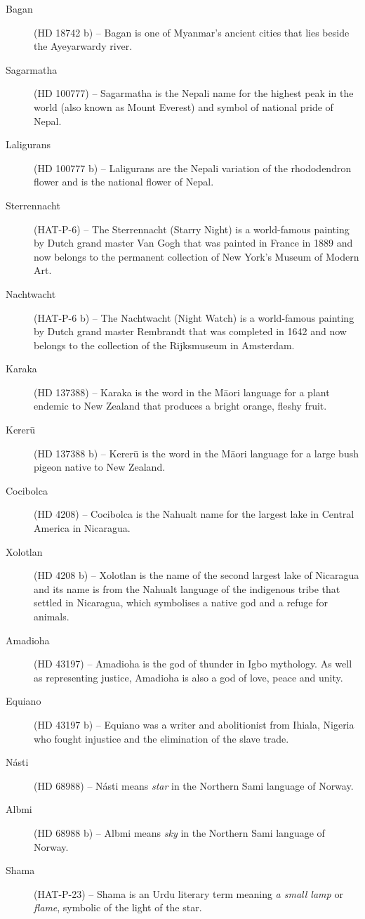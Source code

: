 \begin{description}
\item[Bagan] (HD 18742 b) -- Bagan is one of Myanmar's ancient cities that lies beside the Ayeyarwardy river.
\item[Sagarmatha] (HD 100777) -- Sagarmatha is the Nepali name for the highest peak in the world (also known as Mount Everest) and symbol of national pride of Nepal.
\item[Laligurans] (HD 100777 b) -- Laligurans are the Nepali variation of the rhododendron flower and is the national flower of Nepal.
\item[Sterrennacht] (HAT-P-6) -- The Sterrennacht (Starry Night) is a world-famous painting by Dutch grand master Van Gogh that was painted in France in 1889 and now belongs to the permanent collection of New York's Museum of Modern Art.
\item[Nachtwacht] (HAT-P-6 b) -- The Nachtwacht (Night Watch) is a world-famous painting by Dutch grand master Rembrandt that was completed in 1642 and now belongs to the collection of the Rijksmuseum in Amsterdam.
\item[Karaka] (HD 137388) -- Karaka is the word in the Māori language for a plant endemic to New Zealand that produces a bright orange, fleshy fruit.
\item[Kererū] (HD 137388 b) -- Kererū is the word in the Māori language for a large bush pigeon native to New Zealand.
\item[Cocibolca] (HD 4208) -- Cocibolca is the Nahualt name for the largest lake in Central America in Nicaragua.
\item[Xolotlan] (HD 4208 b) -- Xolotlan is the name of the second largest lake of Nicaragua and its name is from the Nahualt language of the indigenous tribe that settled in Nicaragua, which symbolises a native god and a refuge for animals.
\item[Amadioha] (HD 43197) -- Amadioha is the god of thunder in Igbo mythology. As well as representing justice, Amadioha is also a god of love, peace and unity.
\item[Equiano] (HD 43197 b) -- Equiano was a writer and abolitionist from Ihiala, Nigeria who fought injustice and the elimination of the slave trade.
\item[Násti] (HD 68988) -- Násti means \textit{star} in the Northern Sami language of Norway.
\item[Albmi] (HD 68988 b) -- Albmi means \textit{sky} in the Northern Sami language of Norway.
\item[Shama] (HAT-P-23) -- Shama is an Urdu literary term meaning \textit{a small lamp} or \textit{flame}, symbolic of the light of the star.

\end{description}
